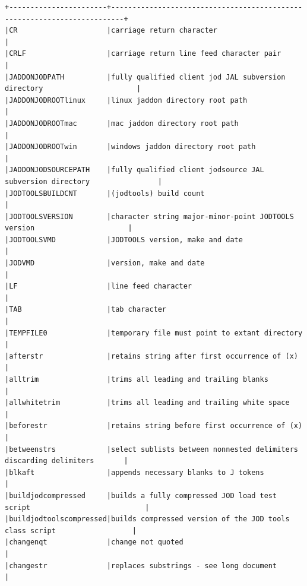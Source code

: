 \documentclass[11pt,letter,landscape]{article}
\begin{document}
    \begin{Verbatim}[commandchars=\\\{\}]
+-----------------------+-------------------------------------------------------------------------+
|CR                     |carriage return character                                                |
|CRLF                   |carriage return line feed character pair                                 |
|JADDONJODPATH          |fully qualified client jod JAL subversion directory                      |
|JADDONJODROOTlinux     |linux jaddon directory root path                                         |
|JADDONJODROOTmac       |mac jaddon directory root path                                           |
|JADDONJODROOTwin       |windows jaddon directory root path                                       |
|JADDONJODSOURCEPATH    |fully qualified client jodsource JAL subversion directory                |
|JODTOOLSBUILDCNT       |(jodtools) build count                                                   |
|JODTOOLSVERSION        |character string major-minor-point JODTOOLS version                      |
|JODTOOLSVMD            |JODTOOLS version, make and date                                          |
|JODVMD                 |version, make and date                                                   |
|LF                     |line feed character                                                      |
|TAB                    |tab character                                                            |
|TEMPFILE0              |temporary file must point to extant directory                            |
|afterstr               |retains string after first occurrence of (x)                             |
|alltrim                |trims all leading and trailing blanks                                    |
|allwhitetrim           |trims all leading and trailing white space                               |
|beforestr              |retains string before first occurrence of (x)                            |
|betweenstrs            |select sublists between nonnested delimiters discarding delimiters       |
|blkaft                 |appends necessary blanks to J tokens                                     |
|buildjodcompressed     |builds a fully compressed JOD load test script                           |
|buildjodtoolscompressed|builds compressed version of the JOD tools class script                  |
|changenqt              |change not quoted                                                        |
|changestr              |replaces substrings - see long document                                  |

\end{Verbatim}
\end{document}
